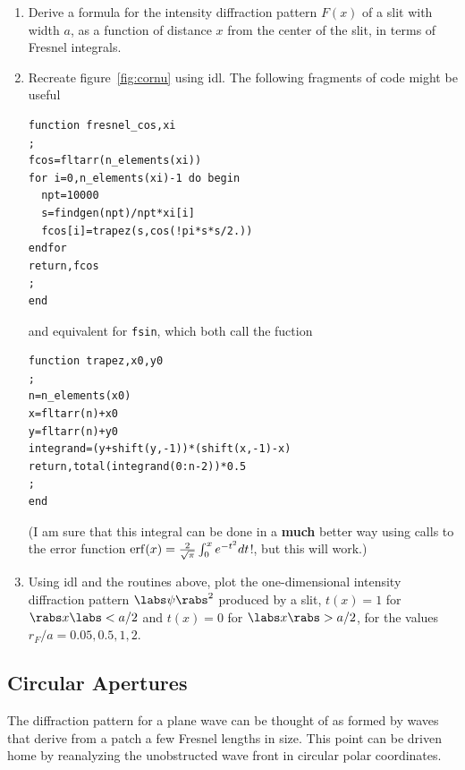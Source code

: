 \begin{enumerate}
\setcounter{enumi}{\value{count}}
\item Derive a formula for the intensity diffraction pattern $F(x)$ of a slit with width $a$, as a
function of distance $x$ from the center of the slit, in terms of Fresnel integrals. 
\item Recreate figure~\ref{fig:cornu} using {\sc idl}. The following fragments of code might 
be useful
\begin{mylisting}
\begin{verbatim}
function fresnel_cos,xi
;
fcos=fltarr(n_elements(xi))
for i=0,n_elements(xi)-1 do begin
  npt=10000
  s=findgen(npt)/npt*xi[i]
  fcos[i]=trapez(s,cos(!pi*s*s/2.))
endfor
return,fcos
;
end
\end{verbatim}
\end{mylisting}
and equivalent for {\tt fsin}, which both call the fuction
\begin{mylisting}
\begin{verbatim}
function trapez,x0,y0
;
n=n_elements(x0)
x=fltarr(n)+x0
y=fltarr(n)+y0
integrand=(y+shift(y,-1))*(shift(x,-1)-x)
return,total(integrand(0:n-2))*0.5
;
end
\end{verbatim}
\end{mylisting}
(I am sure that this integral can be done in a {\bf much} better way
using calls to the error function ${\rm
  erf}(x)={2\over\sqrt{\pi}}\int_0^xe^{-t^2}dt$!, but this will work.)
\item Using {\sc idl}  and the routines above, plot the one-dimensional intensity diffraction pattern
  $\labs\psi\rabs^2$ produced by a slit, $t(x)=1$ for $\rabs x\labs<
  {a/2}$ and $t(x)=0$ for $\labs x\rabs > {a/2}$, for the values
  ${r_F/a}=0.05, 0.5, 1, 2$.
\setcounter{count}{\value{enumi}}
\end{enumerate}

\subsection{Circular Apertures}

The diffraction pattern for a plane wave can be thought of as formed by waves 
that derive from a patch a few Fresnel lengths in size. This point can be 
driven home by reanalyzing the unobstructed wave front in circular polar
coordinates.

